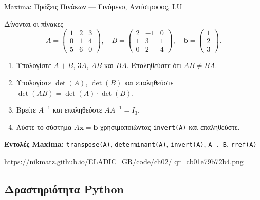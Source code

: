 %

\casactivbox%
  {Maxima: Πράξεις Πινάκων — Γινόμενο, Αντίστροφος, LU}%
  {%
    \label{cas:ch2_matrix_algebra}
    Δίνονται οι πίνακες
    \[
      A = \begin{pmatrix} 1 & 2 & 3 \\ 0 & 1 & 4 \\ 5 & 6 & 0 \end{pmatrix},
      \quad
      B = \begin{pmatrix} 2 & -1 & 0 \\ 1 & 3 & 1 \\ 0 & 2 & 4 \end{pmatrix},
      \quad
      \mathbf{b} = \begin{pmatrix} 1 \\ 2 \\ 3 \end{pmatrix}.
    \]
    \begin{enumerate}[label=(\alph*),itemsep=2pt]
      \item Υπολογίστε $A+B$, $3A$, $AB$ και $BA$. Επαληθεύστε ότι
        $AB \neq BA$.
      \item Υπολογίστε $\det(A)$, $\det(B)$ και επαληθεύστε
        $\det(AB) = \det(A)\cdot\det(B)$.
      \item Βρείτε $A^{-1}$ και επαληθεύστε $A A^{-1} = I_3$.
      \item Λύστε το σύστημα $A\mathbf{x} = \mathbf{b}$ χρησιμοποιώντας
        \texttt{invert(A)} και επαληθεύστε.
    \end{enumerate}
    \smallskip
    \textbf{Εντολές Maxima:}
    \texttt{transpose(A)}, \texttt{determinant(A)},
    \texttt{invert(A)}, \texttt{A . B}, \texttt{rref(A)}
  }%
  {https://nikmatz.github.io/ELADIC_GR/code/ch02/}%
  {qr_cb01e79b72b4.png}

\subsection*{Δραστηριότητα Python}

